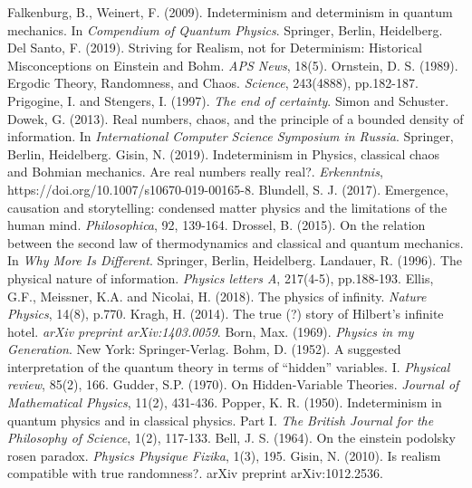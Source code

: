 \documentclass[aps,prl,twocolumn,showpacs,superscriptaddress,groupedaddress, nofootinbib]{revtex4-1}
\begin{document}
\begin{small}
\begin{thebibliography}{200}
 Falkenburg, B., Weinert, F. (2009). Indeterminism and determinism in quantum mechanics. In \emph{Compendium of Quantum Physics}. Springer, Berlin, Heidelberg.
 Del Santo, F. (2019). Striving for Realism, not for Determinism: Historical Misconceptions on Einstein and Bohm. \emph{APS News}, 18(5).
 Ornstein, D. S. (1989). Ergodic Theory, Randomness, and Chaos. \emph{Science}, 243(4888), pp.182-187.
 Prigogine, I. and Stengers, I. (1997). \emph{The end of certainty}. Simon and Schuster.
 Dowek, G. (2013). Real numbers, chaos, and the principle of a bounded density of information. In \emph{International Computer Science Symposium in Russia}. Springer, Berlin, Heidelberg.
 Gisin, N. (2019). Indeterminism in Physics, classical chaos and Bohmian mechanics. Are real numbers really real?. \emph{Erkenntnis}, https://doi.org/10.1007/s10670-019-00165-8.
 Blundell, S. J. (2017). Emergence, causation and storytelling: condensed matter physics and the limitations of the human mind. \emph{Philosophica}, 92, 139-164.
 Drossel, B. (2015). On the relation between the second law of thermodynamics and classical and quantum mechanics. In \emph{Why More Is Different}. Springer, Berlin, Heidelberg.
 Landauer, R. (1996). The physical nature of information. \emph{Physics letters A}, 217(4-5), pp.188-193.
Ellis, G.F., Meissner, K.A. and Nicolai, H. (2018). The physics of infinity. \emph{Nature Physics}, 14(8), p.770.
 Kragh, H. (2014). The true (?) story of Hilbert's infinite hotel. \emph{arXiv preprint arXiv:1403.0059}.
 Born, Max. (1969). \emph{Physics in my Generation}. New York: Springer-Verlag. 
 Bohm, D. (1952). A suggested interpretation of the quantum theory in terms of ``hidden'' variables. I. \emph{Physical review}, 85(2), 166.
 Gudder, S.P. (1970). On Hidden‐Variable Theories. \emph{Journal of Mathematical Physics}, 11(2), 431-436.
 Popper, K. R. (1950). Indeterminism in quantum physics and in classical physics. Part I. \emph{The British Journal for the Philosophy of Science}, 1(2), 117-133.
 Bell, J. S. (1964). On the einstein podolsky rosen paradox. \emph{Physics Physique Fizika}, 1(3), 195.
 Gisin, N. (2010). Is realism compatible with true randomness?. arXiv preprint arXiv:1012.2536. 

\end{thebibliography}
\end{small}
\end{document}
